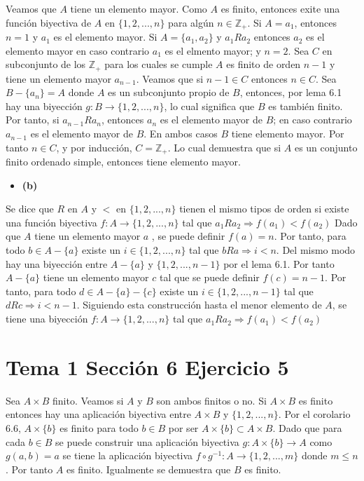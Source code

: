 \documentclass{article}
\begin{document}
Veamos que $A$ tiene un elemento mayor. Como $A$ es finito, entonces exite una función biyectiva de $A$ en $\{1,2,...,n\}$ para algún $n\in \mathbb{Z}_{+}$. Si $A={a_1}$, entonces $n=1$ y $a_1$ es el elemento mayor. Si $A=\{a_1,a_2\}$ y $a_1Ra_2$ entonces $a_2$ es el elemento mayor en caso contrario $a_1$ es el elmento mayor; y $n=2$. Sea $C$ en subconjunto de los $\mathbb{Z}_{+}$ para los cuales se cumple $A$ es finito de orden $n-1$ y tiene un elemento mayor $a_{n-1}$. Veamos que si $n-1\in C$ entonces $n\in C$. Sea $B-\{a_n\}=A$ donde $A$ es  un subconjunto propio de $B$, entonces, por lema 6.1 hay una biyección $g:B\rightarrow \{1,2,...,n\}$, lo cual significa que $B$ es también finito. Por tanto, si $a_{n-1}Ra_n$, entonces $a_n$ es el elemento mayor de $B$; en caso contrario $a_{n-1}$ es el elemento mayor de $B$. En ambos casos $B$ tiene elemento mayor. Por tanto $n\in C$, y por inducción, $C=\mathbb{Z}_{+}$. Lo cual demuestra que si $A$ es un conjunto finito ordenado simple, entonces tiene elemento mayor.
\begin{itemize}
\item \bf (b) \rm
\end{itemize}
Se dice que $R$ en $A$ y $<$ en $\{1,2,...,n\}$ tienen el mismo tipos de orden si existe una función biyectiva $f:A\rightarrow \{1,2,...,n\}$ tal que $a_1Ra_2 \Rightarrow f(a_1)<f(a_2)$ Dado que $A$ tiene un elemento mayor $a$ , se puede definir $f(a)=n$. Por tanto, para todo $b\in A-\{a\}$ existe un $i\in \{1,2,...,n\}$ tal que $bRa\Rightarrow i<n$. Del mismo modo hay una biyección entre $A-\{a\}$ y $\{1,2,...,n-1\}$ por el lema 6.1. Por tanto $A-\{a\}$ tiene un elemento mayor $c$ tal que se puede definir $f(c)=n-1$. Por tanto, para todo $d\in A-\{a\}-\{c\}$ existe un $i\in \{1,2,...,n-1\}$ tal que $dRc\Rightarrow i<n-1$. Siguiendo esta construcción hasta el menor elemento de $A$, se tiene una biyección $f:A\rightarrow \{1,2,...,n\}$ tal que $a_1Ra_2\Rightarrow f(a_1)<f(a_2)$
\section{Tema 1 Sección 6 Ejercicio 5}
Sea $A\times B$ finito. Veamos si $A$ y $B$ son ambos finitos o no. Si $A\times B$ es finito entonces hay una aplicación biyectiva entre $A\times B$ y $\{1,2,...,n\}$. Por el corolario 6.6,  $A\times \{b\}$ es finito para todo $b\in B$ por ser $A\times \{b\}\subset A\times B$. Dado que para cada $b\in B$ se puede construir una aplicación biyectiva $g:A\times \{b\}\rightarrow A$  como $g(a,b)=a$ se tiene la aplicación biyectiva $f\circ g^{-1}: A\rightarrow \{1,2,...,m\}$ donde $m\leq n$. Por tanto $A$ es finito. Igualmente se demuestra que $B$ es finito.
\end{document}
